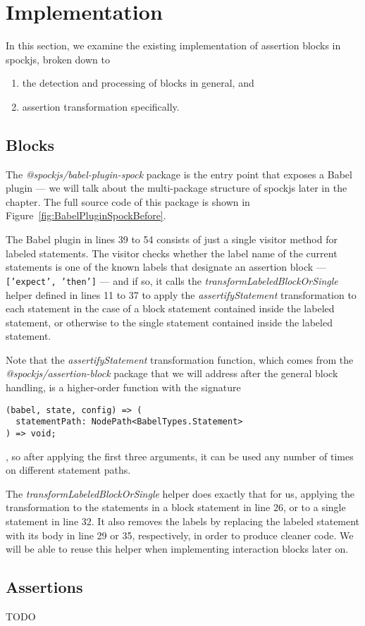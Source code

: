 \section{Implementation}
In this section, we examine the existing implementation of assertion blocks in spockjs, broken down to
\begin{enumerate}
  \item the detection and processing of blocks in general, and
  \item assertion transformation specifically.
\end{enumerate}

\subsection{Blocks}
The \textit{@spockjs/babel-plugin-spock} package is the entry point that exposes a Babel plugin ---
we will talk about the multi-package structure of spockjs later in the chapter.
The full source code of this package is shown in Figure~\ref{fig:BabelPluginSpockBefore}.

The Babel plugin in lines 39 to 54 consists of just a single visitor method for labeled statements.
The visitor checks whether the label name of the current statements
is one of the known labels that designate an assertion block
--- \texttt{['expect', 'then']} --- and if so,
it calls the \textit{transformLabeledBlockOrSingle} helper defined in lines 11 to 37
to apply the \textit{assertifyStatement} transformation
to each statement in the case of a block statement contained inside the labeled statement,
or otherwise to the single statement contained inside the labeled statement.

Note that the \textit{assertifyStatement} transformation function,
which comes from the \textit{@spockjs/assertion-block} package that we will address after the general block handling,
is a higher-order function with the signature
\begin{verbatim}
(babel, state, config) => (
  statementPath: NodePath<BabelTypes.Statement>
) => void;
\end{verbatim}
, so after applying the first three arguments,
it can be used any number of times on different statement paths.

The \textit{transformLabeledBlockOrSingle} helper does exactly that for us,
applying the transformation to the statements in a block statement in line 26,
or to a single statement in line 32.
It also removes the labels by
replacing the labeled statement with its body
in line 29 or 35, respectively,
in order to produce cleaner code.
We will be able to reuse this helper when implementing
interaction blocks later on.



\subsection{Assertions}
TODO
